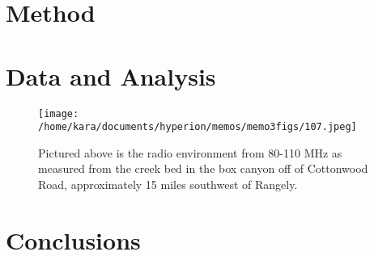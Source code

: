 \documentclass[11pt]{article}
\begin{document}
\section{Method}


\section{Data and Analysis}

\begin{figure}
    \begin{center}
    \texttt{[image: /home/kara/documents/hyperion/memos/memo3figs/107.jpeg]}
    \end{center}
    \caption{
        Pictured above is the radio environment from 80-110 MHz as measured 
        from the creek bed in the box canyon off of Cottonwood Road, 
        approximately 15 miles southwest of Rangely.
    }
    \label{fig:107}
\end{figure}

\section{Conclusions}


{}

\end{document}
